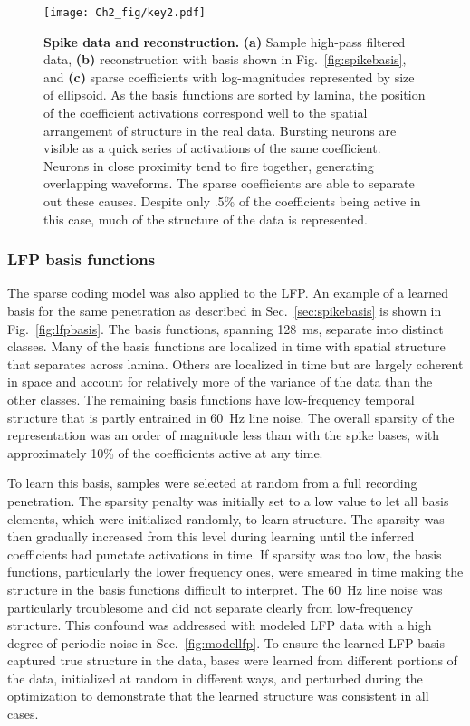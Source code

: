 \begin{figure}[htp!]
  \centering
  \texttt{[image: Ch2\_fig/key2.pdf]}
  \caption{\textbf{Spike data and reconstruction.} \textbf{(a)} Sample
    high-pass filtered data, \textbf{(b)} reconstruction with basis
    shown in Fig.~\ref{fig:spikebasis}, and \textbf{(c)} sparse
    coefficients with log-magnitudes represented by size of
    ellipsoid. As the basis functions are sorted by lamina, the
    position of the coefficient activations correspond well to the
    spatial arrangement of structure in the real data. Bursting
    neurons are visible as a quick series of activations of the same
    coefficient. Neurons in close proximity tend to fire together,
    generating overlapping waveforms. The sparse coefficients are able
    to separate out these causes. Despite only .5\% of the
    coefficients being active in this case, much of the structure of
    the data is represented. }
  \label{fig:spikerecon}
\end{figure}
\afterpage{\clearpage}

\subsubsection{LFP basis functions}

The sparse coding model was also applied to the LFP. An example of a
learned basis for the same penetration as described in
Sec.~\ref{sec:spikebasis} is shown in Fig.~\ref{fig:lfpbasis}. The
basis functions, spanning 128~ms, separate into distinct classes. Many
of the basis functions are localized in time with spatial structure
that separates across lamina. Others are localized in time but are
largely coherent in space and account for relatively more of the
variance of the data than the other classes. The remaining basis
functions have low-frequency temporal structure that is partly
entrained in 60~Hz line noise. The overall sparsity of the
representation was an order of magnitude less than with the spike
bases, with approximately 10\% of the coefficients active at any time.

To learn this basis, samples were selected at random from a full
recording penetration. The sparsity penalty was initially set to a low
value to let all basis elements, which were initialized randomly, to
learn structure. The sparsity was then gradually increased from this
level during learning until the inferred coefficients had punctate
activations in time. If sparsity was too low, the basis functions,
particularly the lower frequency ones, were smeared in time making the
structure in the basis functions difficult to interpret. The 60~Hz
line noise was particularly troublesome and did not separate clearly
from low-frequency structure. This confound was addressed with modeled
LFP data with a high degree of periodic noise in
Sec.~\ref{fig:modellfp}. To ensure the learned LFP basis captured true
structure in the data, bases were learned from different portions of
the data, initialized at random in different ways, and perturbed
during the optimization to demonstrate that the learned structure was
consistent in all cases.

